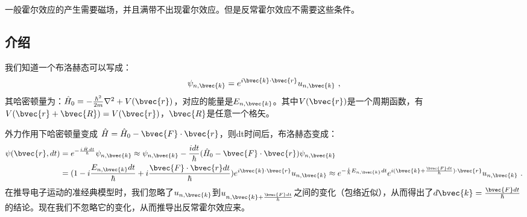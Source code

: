 \begin{issues}
\issueDraft
\end{issues}
一般霍尔效应的产生需要磁场，并且满带不出现霍尔效应。但是反常霍尔效应不需要这些条件。
\subsection{介绍}
我们知道一个布洛赫态可以写成：
\begin{equation}
\psi_{n,\bvec{k}}=e^{i\bvec{k}\cdot\bvec{r}}u_{n,\bvec{k}}~,
\end{equation}
其哈密顿量为：$\hat H_0=-\frac{\hbar^2}{2m}\nabla^2+V(\bvec{r})$，对应的能量是$E_{n,\bvec{k}}$。其中$V(\bvec{r})$是一个周期函数，有$V(\bvec{r}+\bvec{R})=V(\bvec{r})$，$\bvec{R}$是任意一个格矢。

外力作用下哈密顿量变成 $\hat H =\hat H_0 -\bvec{F}\cdot\bvec{r}$，则dt时间后，布洛赫态变成：
\begin{equation}
\begin{aligned}
\psi(\bvec{r},dt)&=e^{-\frac{i\,\hat H\,dt}{\hbar}}\psi_{n,\bvec{k}} \approx \psi_{n,\bvec{k}}-\frac{idt}{\hbar}(\hat H_0 -\bvec{F}\cdot\bvec{r})\psi_{n,\bvec{k}}\\
&=(1-i\frac{E_{n,\bvec{k}}dt}{\hbar}+i\frac{\bvec{F}\cdot\bvec{r}dt}{\hbar})e^{i\bvec{k}\cdot\bvec{r}}u_{n,\bvec{k}}
\approx e^{-\frac{i}{\hbar}E_{n,\bvec{k}}dt}e^{i(\bvec{k}+\frac{\bvec{F}dt}{\hbar})\cdot \bvec{r}}u_{n,\bvec{k}}~.
\end{aligned}
\end{equation}
在推导电子运动的准经典模型时，我们忽略了$u_{n,\bvec{k}}$到$u_{n,\bvec{k}+\frac{\bvec{F}dt}{\hbar}}$之间的变化（包络近似），从而得出了$d\bvec{k}=\frac{\bvec{F}dt}{\hbar}$的结论。现在我们不忽略它的变化，从而推导出反常霍尔效应来。

